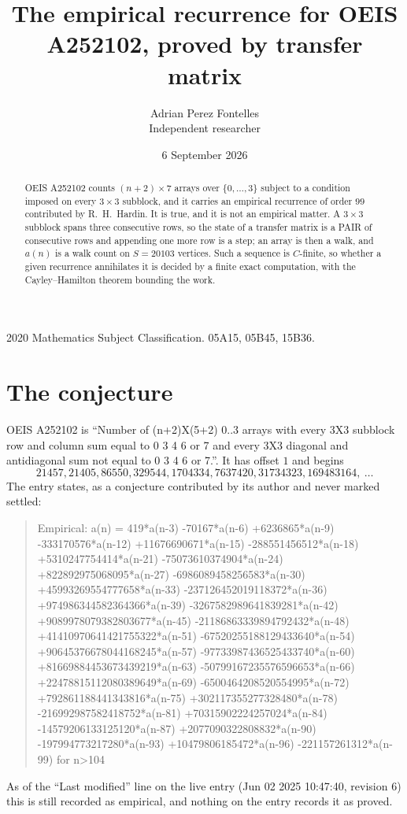 \documentclass[11pt,a4paper]{article}
\title{The empirical recurrence for OEIS A252102, proved by transfer matrix}
\author{Adrian Perez Fontelles\\ \small Independent researcher}
\date{6 September 2026}
\theoremstyle{plain}
\theoremstyle{definition}
\begin{document}
\maketitle

\begin{abstract}
OEIS A252102 counts $(n+2)\times7$ arrays over $\{0,\dots,3\}$ subject to a condition imposed on
every $3\times3$ subblock, and it carries an empirical recurrence of order $99$
contributed by R.~H.~Hardin. It is true, and it is not an empirical matter. A $3\times3$
subblock spans three consecutive rows, so the state of a transfer matrix is a PAIR of
consecutive rows and appending one more row is a step; an array is then a walk, and
$a(n)$ is a walk count on $S=20103$ vertices. Such a sequence is $C$-finite, so whether a given
recurrence annihilates it is decided by a finite exact computation, with the Cayley--Hamilton
theorem bounding the work.
\end{abstract}

\noindent\small 2020 Mathematics Subject Classification. 05A15, 05B45, 15B36.\normalsize

\section{The conjecture}

OEIS A252102 is ``Number of (n+2)X(5+2) 0..3 arrays with every 3X3 subblock row and column sum equal to 0 3 4 6 or 7 and every 3X3 diagonal and antidiagonal sum not equal to 0 3 4 6 or 7.''. It has offset $1$ and begins
\[
21457, 21405, 86550, 329544, 1704334, 7637420, 31734323, 169483164,\ \dots
\]
The entry states, as a conjecture contributed by its author and never marked settled:
\begin{quote}
Empirical: a(n) = 419*a(n-3) -70167*a(n-6) +6236865*a(n-9) -333170576*a(n-12) +11676690671*a(n-15) -288551456512*a(n-18) +5310247754414*a(n-21) -75073610374904*a(n-24) +822892975068095*a(n-27) -6986089458256583*a(n-30) +45993269554777658*a(n-33) -237126452019118372*a(n-36) +974986344582364366*a(n-39) -3267582989641839281*a(n-42) +9089978079382803677*a(n-45) -21186863339894792432*a(n-48) +41410970641421755322*a(n-51) -67520255188129433640*a(n-54) +90645376678044168245*a(n-57) -97733987436525433740*a(n-60) +81669884453673439219*a(n-63) -50799167235576596653*a(n-66) +22478815112080389649*a(n-69) -6500464208520554995*a(n-72) +792861188441343816*a(n-75) +302117355277328480*a(n-78) -216992987582418752*a(n-81) +70315902224257024*a(n-84) -14579206133125120*a(n-87) +2077090322808832*a(n-90) -197994773217280*a(n-93) +10479806185472*a(n-96) -221157261312*a(n-99) for n>104
\end{quote}
As of the ``Last modified'' line on the live entry (Jun 02 2025 10:47:40, revision 6) this is still
recorded as empirical, and nothing on the entry records it as proved.
\end{document}

